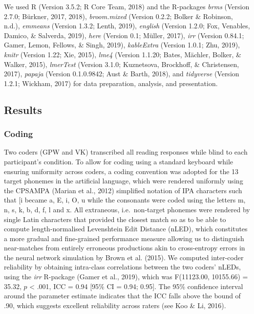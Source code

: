 \documentclass[doc,floatsintext]{apa6}
\begin{document}
We used R (Version 3.5.2; R Core Team, 2018) and the R-packages
\emph{brms} (Version 2.7.0; Bürkner, 2017, 2018), \emph{broom.mixed}
(Version 0.2.2; Bolker \& Robinson, n.d.), \emph{emmeans} (Version
1.3.2; Lenth, 2019), \emph{english} (Version 1.2.0; Fox, Venables,
Damico, \& Salverda, 2019), \emph{here} (Version 0.1; Müller, 2017),
\emph{irr} (Version 0.84.1; Gamer, Lemon, Fellows, \& Singh, 2019),
\emph{kableExtra} (Version 1.0.1; Zhu, 2019), \emph{knitr} (Version
1.22; Xie, 2015), \emph{lme4} (Version 1.1.20; Bates, Mächler, Bolker,
\& Walker, 2015), \emph{lmerTest} (Version 3.1.0; Kuznetsova, Brockhoff,
\& Christensen, 2017), \emph{papaja} (Version 0.1.0.9842; Aust \& Barth,
2018), and \emph{tidyverse} (Version 1.2.1; Wickham, 2017) for data
preparation, analysis, and presentation.

\subsection{Results}\label{results}

\subsubsection{Coding}\label{coding}

Two coders (GPW and VK) transcribed all reading responses while blind to
each participant's condition. To allow for coding using a standard
keyboard while ensuring uniformity across coders, a coding convention
was adopted for the 13 target phonemes in the artificial language, which
were rendered uniformly using the CPSAMPA (Marian et al., 2012)
simplified notation of IPA characters such that
{[}i\textipa{U}{]} became a, E, i, O, u
while the consonants were coded using the letters m, n, s, k, b, d, f, l
and x. All extraneous, i.e.~non-target phonemes were rendered by single
Latin characters that provided the closest match so as to be able to
compute length-normalised Levenshtein Edit Distance (nLED), which
constitutes a more gradual and fine-grained performance measure allowing
us to distinguish near-matches from entirely erroneous productions akin
to cross-entropy errors in the neural network simulation by Brown et al.
(2015). We computed inter-coder reliability by obtaining intra-class
correlations between the two coders' nLEDs, using the \emph{irr}
R-package (Gamer et al., 2019), which was F(11123.00, 10155.66) = 35.32,
\(p\) \textless{} .001, ICC = 0.94 {[}95\% CI = 0.94; 0.95{]}. The 95\%
confidence interval around the parameter estimate indicates that the ICC
falls above the bound of .90, which suggests excellent reliability
across raters (see Koo \& Li, 2016).
\end{document}
